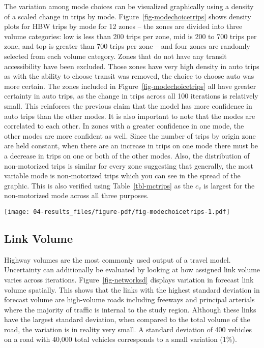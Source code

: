 \documentclass[
  letterpaper,
]{trb}
\begin{document}
The variation among mode choices can be visualized graphically using a
density of a scaled change in trips by mode.
Figure~\ref{fig-modechoicetrips} shows density plots for HBW trips by
mode for 12 zones -- the zones are divided into three volume categories:
low is less than 200 trips per zone, mid is 200 to 700 trips per zone,
and top is greater than 700 trips per zone -- and four zones are
randomly selected from each volume category. Zones that do not have any
transit accessibility have been excluded. Those zones have very high
density in auto trips as with the ability to choose transit was removed,
the choice to choose auto was more certain. The zones included in
Figure~\ref{fig-modechoicetrips} all have greater certainty in auto
trips, as the change in trips across all 100 iterations is relatively
small. This reinforces the previous claim that the model has more
confidence in auto trips than the other modes. It is also important to
note that the modes are correlated to each other. In zones with a
greater confidence in one mode, the other modes are more confident as
well. Since the number of trips by origin zone are held constant, when
there are an increase in trips on one mode there must be a decrease in
trips on one or both of the other modes. Also, the distribution of
non-motorized trips is similar for every zone suggesting that generally,
the most variable mode is non-motorized trips which you can see in the
spread of the graphic. This is also verified using
Table~\ref{tbl-mctrips} as the \(c_v\) is largest for the non-motorized
mode across all three purposes.

\begin{sidewaysfigure}

{\centering \texttt{[image: 04-results\_files/figure-pdf/fig-modechoicetrips-1.pdf]}

}

\caption{\label{fig-modechoicetrips}Trip density for coefficient of
variation by mode for HBW trips.}

\end{sidewaysfigure}

\hypertarget{link-volume}{%
\subsection{Link Volume}\label{link-volume}}

Highway volumes are the most commonly used output of a travel model.
Uncertainty can additionally be evaluated by looking at how assigned
link volume varies across iterations. Figure~\ref{fig-networksd}
displays variation in forecast link volume spatially. This shows that
the links with the highest standard deviation in forecast volume are
high-volume roads including freeways and principal arterials where the
majority of traffic is internal to the study region. Although these
links have the largest standard deviation, when compared to the total
volume of the road, the variation is in reality very small. A standard
deviation of 400 vehicles on a road with 40,000 total vehicles
corresponds to a small variation (1\%).
\end{document}
